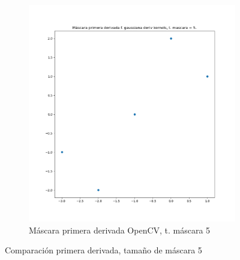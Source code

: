 \documentclass[12pt, spanish]{article}
\begin{document}
\begin{figure}[H]
\begin{subfigure}[t]{0.4\textwidth}
		\includegraphics[width = \textwidth]{cmp-cv5.png}
 		 \caption{Máscara primera derivada OpenCV, t. máscara 5}
	\end{subfigure}
	\caption{Comparación primera derivada, tamaño de máscara 5}
  	\label{fig:ej1c5}
\end{figure}
\end{document}
